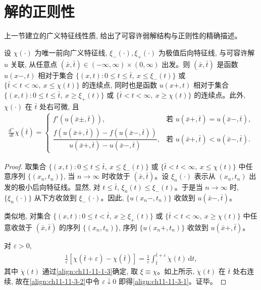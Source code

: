 \documentclass[../../main.tex]{subfiles}
\begin{document}
\section{解的正则性}\label{section:ch11-解的正则性}

上一节建立的广义特征线性质, 给出了可容许弱解结构与正则性的精确描述。

\begin{theorem}\label{theorem:ch11-11-3-1}
设 $\chi(\cdot)$ 为唯一前向广义特征线, $\xi_-(\cdot),\xi_+(\cdot)$ 为极值后向特征线, 与可容许解 $u$ 关联, 从任意点 $(\bar x,\bar t)\in(-\infty,\infty)\times(0,\infty)$ 出发。则 $(\bar x,\bar t)$ 是函数 $u(x-,t)$ 相对于集合 $\{(x,t):0\leqslant t\leqslant\bar t,\ x\leqslant\xi_-(t)\}$ 或 $\{\bar t<t<\infty,\ x\leqslant\chi(t)\}$ 的连续点, 同时也是函数 $u(x+,t)$ 相对于集合 $\{(x,t):0\leqslant t\leqslant\bar t,\ x\geqslant\xi_+(t)\}$ 或 $\{\bar t<t<\infty,\ x\geqslant\chi(t)\}$ 的连续点。此外, $\chi(\cdot)$ 在 $\bar t$ 处右可微, 且
\begin{align}
\frac{d^+}{dt}\chi(\bar t)=
\begin{cases}
f'(u(\bar x\pm,\bar t)), & \text{若 }u(\bar x+,\bar t)=u(\bar x-,\bar t),\\[2mm]
\dfrac{f(u(\bar x+,\bar t))-f(u(\bar x-,\bar t))}{u(\bar x+,\bar t)-u(\bar x-,\bar t)}, & \text{若 }u(\bar x+,\bar t)<u(\bar x-,\bar t).
\end{cases}\label{align:ch11-11-3-1}
\end{align}
\end{theorem}

\begin{proof}
取集合 $\{(x,t):0\leqslant t\leqslant\bar t,\ x\leqslant\xi_-(t)\}$ 或 $\{\bar t<t<\infty,\ x\leqslant\chi(t)\}$ 中任意序列 $\{(x_n,t_n)\}$, 当 $n\to\infty$ 时收敛于 $(\bar x,\bar t)$。设 $\xi_n(\cdot)$ 表示从 $(x_n,t_n)$ 出发的极小后向特征线。显然, 对 $t\leqslant\bar t$, $\xi_n(t)\leqslant\xi_-(t)$。于是当 $n\to\infty$ 时, $\{\xi_n(\cdot)\}$ 从下方收敛到 $\xi_-(\cdot)$。因此, $\{u(x_n-,t_n)\}$ 收敛到 $u(\bar x-,\bar t)$。

类似地, 对集合 $\{(x,t):0\leqslant t<\bar t,\ x\geqslant\xi_+(t)\}$ 或 $\{\bar t<t<\infty,\ x\geqslant\chi(t)\}$ 中任意收敛于 $(\bar x,\bar t)$ 的序列 $\{(x_n,t_n)\}$, 序列 $\{u(x_n+,t_n)\}$ 收敛到 $u(\bar x+,\bar t)$。

对 $\varepsilon>0$,
\begin{align}
\frac{1}{\varepsilon}[\chi(\bar t+\varepsilon)-\chi(\bar t)]=\frac{1}{\varepsilon}\int_{\bar t}^{\bar t+\varepsilon}\dot{\chi}(t)\,\mathrm{d}t,\label{align:ch11-11-3-2}
\end{align}
其中 $\dot{\chi}(t)$ 通过\eqref{align:ch11-11-1-3}确定, 取 $\xi\equiv\chi$。如上所示, $\dot{\chi}(t)$ 在 $\bar t$ 处右连续, 故在\eqref{align:ch11-11-3-2}中令 $\varepsilon\downarrow0$ 即得\eqref{align:ch11-11-3-1}。证毕。
\end{proof}
\end{document}
